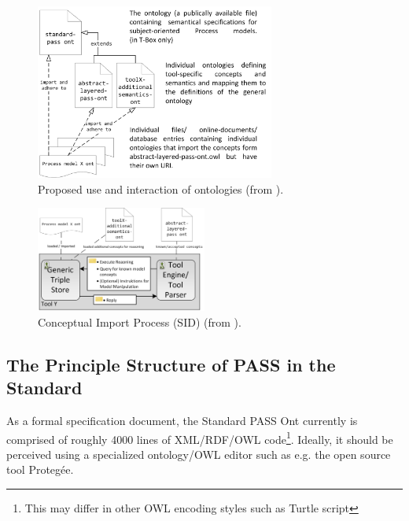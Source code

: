 
\begin{figure}[ht]
	\centering
	\includegraphics[width=0.7\textwidth]{Figures/Ontology/Introduction/ont-and-models.png}
	\caption{Proposed use and interaction of ontologies (from \cite{elster:ont} ).}
	\label{fig:ontAndModel}
\end{figure}

\begin{figure}[ht]
	\centering
	\includegraphics[width=0.50\textwidth]{Figures/Ontology/Introduction/importWorkflow.png}
	\caption{Conceptual Import Process (SID) (from \cite{elster:ont}). }
	\label{fig:ImportOnt}
\end{figure}



\subsection{ The Principle Structure of PASS in the Standard}

As a formal specification document, the Standard PASS Ont currently is comprised of roughly 4000 lines of XML/RDF/OWL code\footnote{This may differ in other OWL encoding styles such as Turtle script}. Ideally, it should be perceived using a specialized ontology/OWL editor such as e.g. the open source tool Protegée. 

